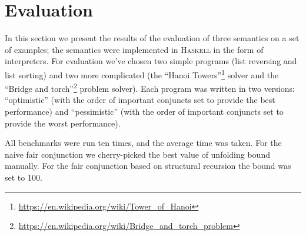 \section{Evaluation}
\label{sec:eval}

In this section we present the results of the evaluation of three semantics on a set of examples; the semantics were implemented in \textsc{Haskell} in the form of interpreters.
For evaluation we've chosen two simple programs (list reversing and list sorting) and two more complicated (the ``Hanoi Towers''\footnote{\url{https://en.wikipedia.org/wiki/Tower_of_Hanoi}} solver and the
``Bridge and torch''\footnote{\url{https://en.wikipedia.org/wiki/Bridge_and_torch_problem}} problem solver).
Each program was written in two versions: ``optimistic'' (with the order of important conjuncts set to provide the best performance) and ``pessimistic'' (with the order of important
conjuncts set to provide the worst performance).

All benchmarks were run ten times, and the average time was taken. For the naive fair conjunction we cherry-picked the best value of unfolding bound manually. For the fair conjunction
based on structural recursion the bound was set to 100.

